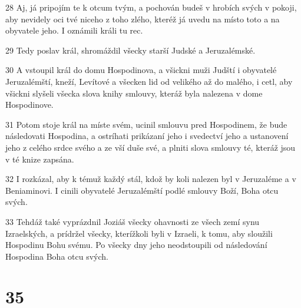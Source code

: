 \par 28 Aj, já pripojím te k otcum tvým, a pochován budeš v hrobích svých v pokoji, aby nevidely oci tvé niceho z toho zlého, kteréž já uvedu na místo toto a na obyvatele jeho. I oznámili králi tu rec.
\par 29 Tedy poslav král, shromáždil všecky starší Judské a Jeruzalémské.
\par 30 A vstoupil král do domu Hospodinova, a všickni muži Judští i obyvatelé Jeruzalémští, kneží, Levítové a všecken lid od velikého až do malého, i cetl, aby všickni slyšeli všecka slova knihy smlouvy, kteráž byla nalezena v dome Hospodinove.
\par 31 Potom stoje král na míste svém, ucinil smlouvu pred Hospodinem, že bude následovati Hospodina, a ostríhati prikázaní jeho i svedectví jeho a ustanovení jeho z celého srdce svého a ze vší duše své, a plniti slova smlouvy té, kteráž jsou v té knize zapsána.
\par 32 I rozkázal, aby k témuž každý stál, kdož by koli nalezen byl v Jeruzaléme a v Beniaminovi. I cinili obyvatelé Jeruzalémští podlé smlouvy Boží, Boha otcu svých.
\par 33 Tehdáž také vyprázdnil Joziáš všecky ohavnosti ze všech zemí synu Izraelských, a prídržel všecky, kterížkoli byli v Izraeli, k tomu, aby sloužili Hospodinu Bohu svému. Po všecky dny jeho neodstoupili od následování Hospodina Boha otcu svých.

\chapter{35}

